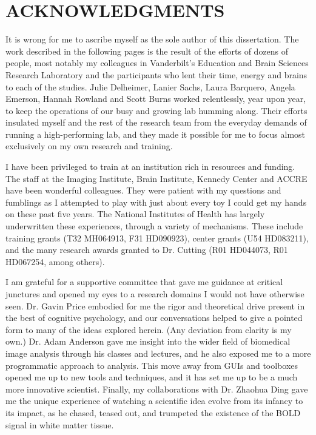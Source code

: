 \documentclass[12pt]{report}  %
\begin{document}
\chapter*{ACKNOWLEDGMENTS}
\vspace{7mm}

It is wrong for me to ascribe myself as the sole author of this dissertation. The work described in the following pages is the result of the efforts of dozens of people, most notably my colleagues in Vanderbilt's Education and Brain Sciences Research Laboratory and the participants who lent their time, energy and brains to each of the studies. Julie Delheimer, Lanier Sachs, Laura Barquero, Angela Emerson, Hannah Rowland and Scott Burns worked relentlessly, year upon year, to keep the operations of our busy and growing lab humming along. Their efforts insulated myself and the rest of the research team from the everyday demands of running a high-performing lab, and they made it possible for me to focus almost exclusively on my own research and training. 

I have been privileged to train at an institution rich in resources and funding. The staff at the Imaging Institute, Brain Institute, Kennedy Center and ACCRE have been wonderful colleagues. They were patient with my questions and fumblings as I attempted to play with just about every toy I could get my hands on these past five years. The National Institutes of Health has largely underwritten these experiences, through a variety of mechanisms. These include training grants (T32 MH064913, F31 HD090923), center grants (U54 HD083211), and the many research awards granted to Dr. Cutting (R01 HD044073, R01 HD067254, among others).

I am grateful for a supportive committee that gave me guidance at critical junctures and opened my eyes to a research domains I would not have otherwise seen. Dr. Gavin Price embodied for me the rigor and theoretical drive present in the best of cognitive psychology, and our conversations helped to give a pointed form to many of the ideas explored herein. (Any deviation from clarity is my own.) Dr. Adam Anderson gave me insight into the wider field of biomedical image analysis through his classes and lectures, and he also exposed me to a more programmatic approach to analysis. This move away from GUIs and toolboxes opened me up to new tools and techniques, and it has set me up to be a much more innovative scientist. Finally, my collaborations with Dr. Zhaohua Ding gave me the unique experience of watching a scientific idea evolve from its infancy to its impact, as he chased, teased out, and trumpeted the existence of the BOLD signal in white matter tissue. 
\end{document}
